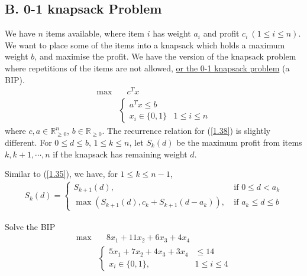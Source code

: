 \subsection{B. 0-1 knapsack Problem}
We have $n$ items available, where item $i$ has weight $a_i$ and profit $c_i\ (1\leqslant i\leqslant n)$. We want to place some of the items into a knapsack which holds a maximum weight $b$, and maximise the profit. We have the version of the knapsack problem where repetitions of the items are not allowed, {\color{red}\uline{or the 0-1 knapsack problem}} (a BIP).
\begin{equation}
    \begin{aligned}
        \max & \quad c^T x\\
        &\left\lbrace\begin{array}{ll}
            a^Tx\leqslant b  &\\
            x_i\in\{0, 1\} & 1\leqslant i\leqslant n
        \end{array} \right.
    \end{aligned}
    \label{1.38}
\end{equation}
where $c, a\in\mathbb{R}^n_{\geqslant 0}$, $b\in\mathbb{R}_{\geqslant 0}$. The recurrence relation for (\ref{1.38}) is slightly different. For $0\leqslant d\leqslant b$, $1\leqslant k\leqslant n$, let $S_k(d)$ be the maximum profit from items $k, k+1, \cdots, n$ if the knapsack has remaining weight $d$.

Similar to (\ref{1.35}), we have, for $1\leqslant k\leqslant n-1$, 
\begin{align}
    S_k(d) = \left\lbrace\begin{array}{ll}
        S_{k+1}(d),  & \ \textrm{if } 0\leqslant d<a_k \\
        \max(S_{k+1}(d), c_k+S_{k+1}(d-a_k)), &\ \textrm{if } a_k\leqslant d\leqslant b
    \end{array}\right. \label{1.39}
\end{align}

\begin{example}
    Solve the BIP 
    \begin{align*}
        \max &\quad 8x_1 + 11x_2 + 6x_3 + 4x_4 \\
        & \left\lbrace\begin{array}{ll}
            5x_1 + 7x_2 + 4x_3 + 3x_4 &\leqslant 14 \\
            x_i \in\{0, 1\}, & 1\leqslant i\leqslant 4
        \end{array} \right.
    \end{align*}
\end{example}

